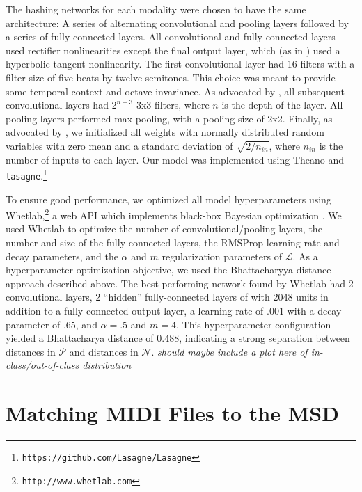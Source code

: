 \documentclass{article}
\begin{document}
The hashing networks for each modality were chosen to have the same architecture: A series of alternating convolutional and pooling layers followed by a series of fully-connected layers.
All convolutional and fully-connected layers used rectifier nonlinearities except the final output layer, which (as in \cite{masci2014multimodal}) used a hyperbolic tangent nonlinearity.
The first convolutional layer had 16 filters with a filter size of five beats by twelve semitones.
This choice was meant to provide some temporal context and octave invariance.
As advocated by \cite{simonyan2014very}, all subsequent convolutional layers had $2^{n + 3}$ 3x3 filters, where $n$ is the depth of the layer.
All pooling layers performed max-pooling, with a pooling size of 2x2.
Finally, as advocated by \cite{he2015delving}, we initialized all weights with normally distributed random variables with zero mean and a standard deviation of $\sqrt{2/n_{in}}$, where $n_{in}$ is the number of inputs to each layer.
Our model was implemented using Theano \cite{bastien2012theano} and \texttt{lasagne}.\footnote{\texttt{https://github.com/Lasagne/Lasagne}}

To ensure good performance, we optimized all model hyperparameters using Whetlab,\footnote{\texttt{http://www.whetlab.com}} a web API which implements black-box Bayesian optimization \cite{snoek2012practical}.
We used Whetlab to optimize the number of convolutional/pooling layers, the number and size of the fully-connected layers, the RMSProp learning rate and decay parameters, and the $\alpha$ and $m$ regularization parameters of $\mathcal{L}$.
As a hyperparameter optimization objective, we used the Bhattacharyya distance approach described above.
The best performing network found by Whetlab had 2 convolutional layers, 2 ``hidden'' fully-connected layers of with 2048 units in addition to a fully-connected output layer, a learning rate of .001 with a decay parameter of .65, and $\alpha = .5$ and $m = 4$.
This hyperparameter configuration yielded a Bhattacharya distance of $0.488$, indicating a strong separation between distances in $\mathcal{P}$ and distances in $\mathcal{N}$.
\textit{should maybe include a plot here of in-class/out-of-class distribution}

\section{Matching MIDI Files to the MSD}
\label{sec:msd}
\end{document}
